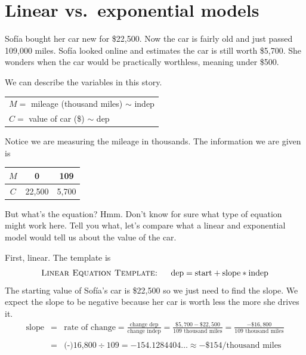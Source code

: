 
\section{Linear vs.\ exponential models}

Sof\'{i}a bought her car new for \$22,500.  Now the car is fairly old and just passed 109,000 miles. Sof\'{i}a looked online and estimates the car is still worth \$5,700.  She wonders when the car would be practically worthless, meaning under \$500.  

We can describe the variables in this story.
\begin{center}
\begin{tabular} {l} 
$M =$ mileage (thousand miles) $\sim$ indep \\
$C=$ value of car (\$) $\sim$ dep \\ 
\end{tabular}
\end{center}
Notice we are measuring the mileage in thousands.
The information we are given is
\begin{center}
\begin{tabular} {|c| |c  |c |}\hline
$M$ & 0 & 109 \\ \hline
$C$ & 22,500 & 5,700  \\ \hline
\end{tabular}
\end{center}
But what's the equation?  Hmm.  Don't know for sure what type of equation might work here.  Tell you what, let's compare what a linear and exponential model would tell us about the value of the car.

First, linear. The template is
$$\textsc{Linear Equation Template: \quad} \text{dep} = \text{start}+\text{slope}\ast\text{indep}$$
The starting value of Sof\'{i}a's car is \$22,500 so we just need to find the slope.  We expect the slope to be negative because her car is worth less the more she drives it.
\begin{eqnarray*}
 \text{slope} & = &\text{rate of change} = \frac{\text{change dep}}{\text{change indep}} = \frac{\$5,700-\$22,500}{109 \text{ thousand miles}} =   \frac{-\$16,800}{109\text{ thousand miles}}\\ \\
 & = & \text{(-)16,800} \div 109 = -154.1284404\ldots \approx -\$\text{154/thousand miles} \\
\end{eqnarray*}  %
\vspace{-.35in} %

